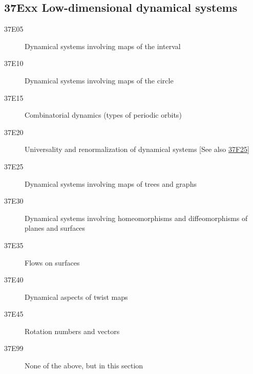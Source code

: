\documentclass[letterpaper]{article}
\begin{document}
\subsection*{37Exx  Low-dimensional dynamical systems }\label{37Exx}
\begin{description} 
\item [37E05]\label{37E05} Dynamical systems involving maps of the interval
\item [37E10]\label{37E10} Dynamical systems involving maps of the circle
\item [37E15]\label{37E15} Combinatorial dynamics (types of periodic orbits)
\item [37E20]\label{37E20} Universality and renormalization of dynamical systems [See also \hyperref[37F25]{37F25}]
\item [37E25]\label{37E25} Dynamical systems involving maps of trees and graphs
\item [37E30]\label{37E30} Dynamical systems involving homeomorphisms and diffeomorphisms of planes and surfaces
\item [37E35]\label{37E35} Flows on surfaces
\item [37E40]\label{37E40} Dynamical aspects of twist maps 
\item [37E45]\label{37E45} Rotation numbers and vectors 
\item [37E99]\label{37E99} None of the above, but in this section
\end{description}
\end{document}
